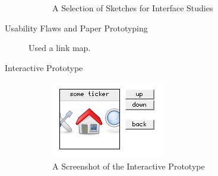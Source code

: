 \begin{description}
\begin{figure}[h]
\begin{center}
  \end{center}
  \caption{A Selection of Sketches for Interface Studies}
  \label{fig:sketches}
\end{figure}
  \item[Usability Flaws and Paper Prototyping]
    Used a link map.
  \item[Interactive Prototype]
\begin{figure}[h]
  \begin{center}
    \includegraphics[width=0.8\linewidth]{imgs/screen.png}
  \end{center}
  \caption{A Screenshot of the Interactive Prototype}
  \label{fig:prototype}
\end{figure}
\end{description}
